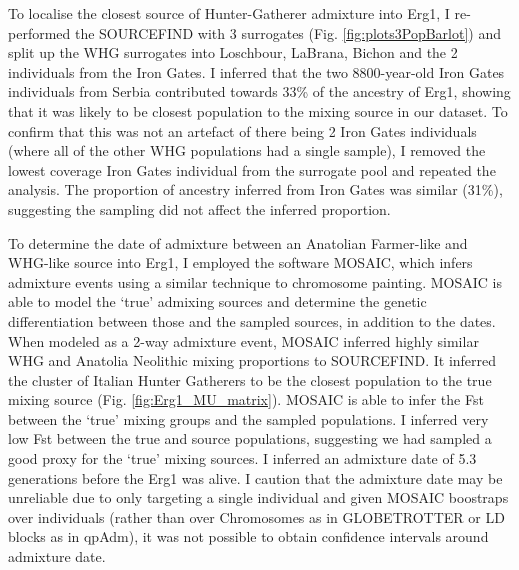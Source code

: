 To localise the closest source of Hunter-Gatherer admixture into Erg1, I re-performed the SOURCEFIND with 3 surrogates (Fig. \ref{fig:plots3PopBarlot}) and split up the WHG surrogates into Loschbour, LaBrana, Bichon and the 2 individuals from the Iron Gates. I inferred that the two 8800-year-old Iron Gates individuals from Serbia contributed towards 33\% of the ancestry of Erg1, showing that it was likely to be closest population to the mixing source in our dataset. To confirm that this was not an artefact of there being 2 Iron Gates individuals (where all of the other WHG populations had a single sample), I removed the lowest coverage Iron Gates individual from the surrogate pool and repeated the analysis. The proportion of ancestry inferred from Iron Gates was similar (31\%), suggesting the sampling did not affect the inferred proportion.

To determine the date of admixture between an Anatolian Farmer-like and WHG-like source into Erg1, I employed the software MOSAIC, which infers admixture events using a similar technique to chromosome painting. MOSAIC is able to model the `true' admixing sources and determine the genetic differentiation between those and the sampled sources, in addition to the dates. When modeled as a 2-way admixture event, MOSAIC inferred highly similar WHG and Anatolia Neolithic mixing proportions to SOURCEFIND. It inferred the cluster of Italian Hunter Gatherers to be the closest population to the true mixing source (Fig. \ref{fig:Erg1_MU_matrix}). MOSAIC is able to infer the Fst between the `true' mixing groups and the sampled populations. I inferred very low Fst between the true and source populations, suggesting we had sampled a good proxy for the `true’ mixing sources. I inferred an admixture date of 5.3 generations before the Erg1 was alive. I caution that the admixture date may be unreliable due to only targeting a single individual and given MOSAIC boostraps over individuals (rather than over Chromosomes as in GLOBETROTTER or LD blocks as in qpAdm), it was not possible to obtain confidence intervals around admixture date. 

